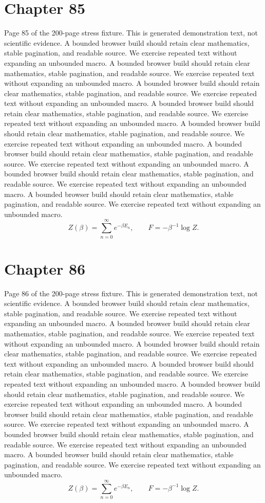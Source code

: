 \documentclass[11pt]{article}
\begin{document}
\section*{Chapter 85}
Page 85 of the 200-page stress fixture. This is generated demonstration text, not scientific evidence.
A bounded browser build should retain clear mathematics, stable pagination, and readable source. We exercise repeated text without expanding an unbounded macro.
A bounded browser build should retain clear mathematics, stable pagination, and readable source. We exercise repeated text without expanding an unbounded macro.
A bounded browser build should retain clear mathematics, stable pagination, and readable source. We exercise repeated text without expanding an unbounded macro.
A bounded browser build should retain clear mathematics, stable pagination, and readable source. We exercise repeated text without expanding an unbounded macro.
A bounded browser build should retain clear mathematics, stable pagination, and readable source. We exercise repeated text without expanding an unbounded macro.
A bounded browser build should retain clear mathematics, stable pagination, and readable source. We exercise repeated text without expanding an unbounded macro.
A bounded browser build should retain clear mathematics, stable pagination, and readable source. We exercise repeated text without expanding an unbounded macro.
A bounded browser build should retain clear mathematics, stable pagination, and readable source. We exercise repeated text without expanding an unbounded macro.
\[Z(\beta)=\sum_{n=0}^{\infty}e^{-\beta E_n},\qquad F=-\beta^{-1}\log Z.\]
\newpage
\section*{Chapter 86}
Page 86 of the 200-page stress fixture. This is generated demonstration text, not scientific evidence.
A bounded browser build should retain clear mathematics, stable pagination, and readable source. We exercise repeated text without expanding an unbounded macro.
A bounded browser build should retain clear mathematics, stable pagination, and readable source. We exercise repeated text without expanding an unbounded macro.
A bounded browser build should retain clear mathematics, stable pagination, and readable source. We exercise repeated text without expanding an unbounded macro.
A bounded browser build should retain clear mathematics, stable pagination, and readable source. We exercise repeated text without expanding an unbounded macro.
A bounded browser build should retain clear mathematics, stable pagination, and readable source. We exercise repeated text without expanding an unbounded macro.
A bounded browser build should retain clear mathematics, stable pagination, and readable source. We exercise repeated text without expanding an unbounded macro.
A bounded browser build should retain clear mathematics, stable pagination, and readable source. We exercise repeated text without expanding an unbounded macro.
A bounded browser build should retain clear mathematics, stable pagination, and readable source. We exercise repeated text without expanding an unbounded macro.
\[Z(\beta)=\sum_{n=0}^{\infty}e^{-\beta E_n},\qquad F=-\beta^{-1}\log Z.\]
\newpage
\end{document}
